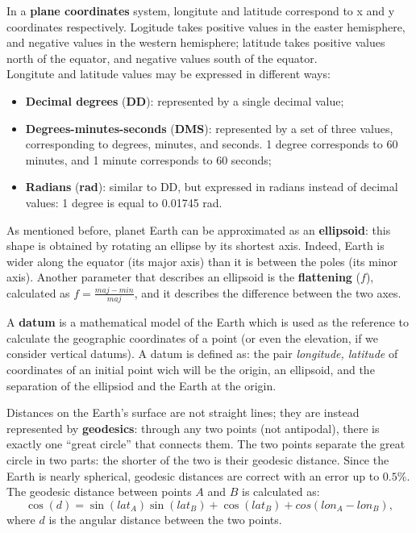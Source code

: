 In a \textbf{plane coordinates} system, longitute and latitude correspond to x and y coordinates respectively. Logitude takes positive values in the easter hemisphere, and negative values in the western hemisphere; latitude takes positive values north of the equator, and negative values south of the equator.
\\
Longitute and latitude values may be expressed in different ways:
\begin{itemize}
    \item \textbf{Decimal degrees} (\textbf{DD}): represented by a single decimal value;
    \item \textbf{Degrees-minutes-seconds} (\textbf{DMS}): represented by a set of three values, corresponding to degrees, minutes, and seconds. 1 degree corresponds to 60 minutes, and 1 minute corresponds to 60 seconds;
    \item \textbf{Radians} (\textbf{rad}): similar to DD, but expressed in radians instead of decimal values: 1 degree is equal to 0.01745 rad.
\end{itemize}

As mentioned before, planet Earth can be approximated as an \textbf{ellipsoid}: this shape is obtained by rotating an ellipse by its shortest axis. Indeed, Earth is wider along the equator (its major axis) than it is between the poles (its minor axis). Another parameter that describes an ellipsoid is the \textbf{flattening} ($f$), calculated as $f = \frac{maj - min}{maj}$, and it describes the difference between the two axes.

A \textbf{datum} is a mathematical model of the Earth which is used as the reference to calculate the geographic coordinates of a point (or even the elevation, if we consider vertical datums). A datum is defined as: the pair \textit{longitude, latitude} of coordinates of an initial point wich will be the origin, an ellipsoid, and the separation of the ellipsiod and the Earth at the origin.

Distances on the Earth's surface are not straight lines; they are instead represented by \textbf{geodesics}: through any two points (not antipodal), there is exactly one ``great circle'' that connects them. The two points separate the great circle in two parts: the shorter of the two is their geodesic distance. Since the Earth is nearly spherical, geodesic distances are correct with an error up to $0.5\%$. The geodesic distance between points $A$ and $B$ is calculated as:
\begin{equation*}
    \cos(d) = \sin(\textit{lat}_A) \sin(\textit{lat}_B) + \cos(\textit{lat}_B) + cos(\textit{lon}_A - \textit{lon}_B),
\end{equation*}
where $d$ is the angular distance between the two points.

